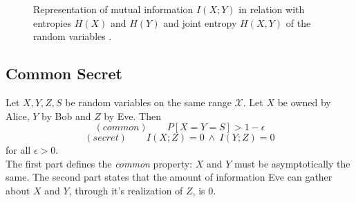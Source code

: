 	\begin{figure}[h]
		\centering
		
		\caption{Representation of mutual information $I(X;Y)$ in relation with entropies $H(X)$ and $H(Y)$ and joint entropy $H(X,Y)$ of the random variables .
		\label{fig:mutual_info}}
	\end{figure}		
	
	\subsection{Common Secret} \label{commonsecret}%
	Let $X,Y,Z,S$ be random variables on the same range $\mathcal{X}$. Let $X$ be owned by Alice, $Y$ by Bob and $Z$ by Eve. Then
	$$ (common) \qquad P[X=Y=S] > 1 - \epsilon $$
	$$ (secret) \qquad I(X;Z) = 0 \: \wedge \: I(Y;Z) = 0 $$
for all $\epsilon > 0 $. \\
The first part defines the \textit{common} property: $X$ and $Y$ must be asymptotically the same. 
The second part states that the amount of information Eve can gather about $X$ and $Y$, through it's realization of $Z$, is $0$.